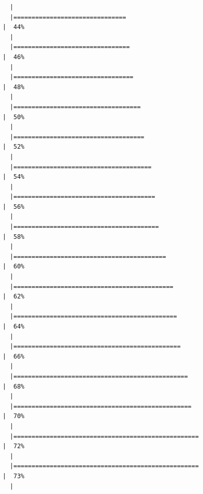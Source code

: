 \documentclass[
  letterpaper,
  DIV=11,
  numbers=noendperiod]{scrreprt}
\begin{document}
\begin{verbatim}
  |                                                                            
  |===============================                                       |  44%
  |                                                                            
  |================================                                      |  46%
  |                                                                            
  |=================================                                     |  48%
  |                                                                            
  |===================================                                   |  50%
  |                                                                            
  |====================================                                  |  52%
  |                                                                            
  |======================================                                |  54%
  |                                                                            
  |=======================================                               |  56%
  |                                                                            
  |========================================                              |  58%
  |                                                                            
  |==========================================                            |  60%
  |                                                                            
  |============================================                          |  62%
  |                                                                            
  |=============================================                         |  64%
  |                                                                            
  |==============================================                        |  66%
  |                                                                            
  |================================================                      |  68%
  |                                                                            
  |=================================================                     |  70%
  |                                                                            
  |===================================================                   |  72%
  |                                                                            
  |===================================================                   |  73%
  |                                                                            

\end{verbatim}
\end{document}
